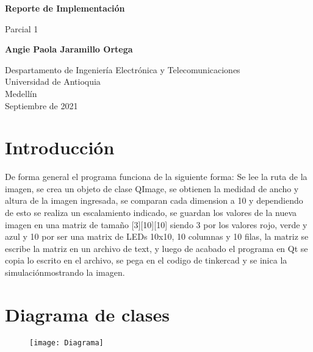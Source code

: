 \documentclass{article}
\begin{document}
\begin{titlepage}
    \begin{center}
        \vspace*{1cm}
            
        \Huge
        \textbf{Reporte de Implementación}
            
        \vspace{0.5cm}
        \LARGE
        Parcial 1
            
        \vspace{1.5cm}
            
        \textbf{Angie Paola Jaramillo Ortega}
            
        \vfill
            
        \vspace{0.8cm}
            
        \Large
        Despartamento de Ingeniería Electrónica y Telecomunicaciones\\
        Universidad de Antioquia\\
        Medellín\\
        Septiembre de 2021
            
    \end{center}
\end{titlepage}
\tableofcontents
\newpage
\section{Introducción}
De forma general el programa funciona de la siguiente forma: Se lee la ruta de la imagen, se crea un objeto de clase QImage, se obtienen la medidad de ancho y altura de la imagen ingresada, se comparan cada dimension a 10 y dependiendo de esto se realiza un escalamiento indicado, se guardan los valores de la nueva imagen en una matriz de tamaño [3][10][10] siendo 3 por los valores rojo, verde y azul y 10 por ser una matrix de LEDs 10x10, 10 columnas y 10 filas, la matriz se escribe la matriz en un archivo de text, y luego de acabado el programa en Qt se copia lo escrito en el archivo, se pega en el codigo de tinkercad y se inica la simulaciónmostrando la imagen.

\section{Diagrama de clases}

\begin{figure}[h]
    \centering
    \texttt{[image: Diagrama]}
\end{figure}
\newpage
\end{document}
